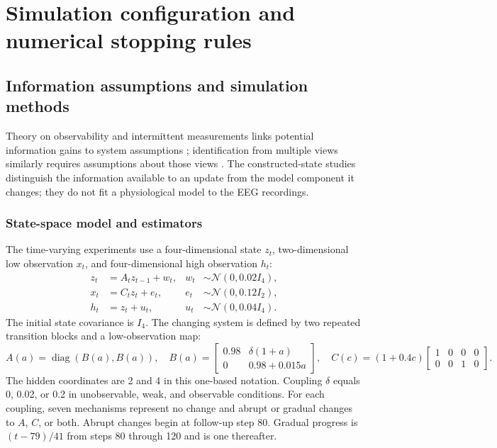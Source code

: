 \documentclass[11pt,a4paper]{article}
\begin{document}
\section{Simulation configuration and numerical stopping rules}
\label{app:simulation}

\subsection{Information assumptions and simulation methods}

Theory on observability and intermittent measurements links potential information gains to system assumptions \cite{sinopoli2004,sandberg2008,ahdab2025}; identification from multiple views similarly requires assumptions about those views \cite{yao2024}. The constructed-state studies distinguish the information available to an update from the model component it changes; they do not fit a physiological model to the EEG recordings.

\subsubsection{State-space model and estimators}
\label{sec:simulation}

The time-varying experiments use a four-dimensional state $z_t$, two-dimensional low observation $x_t$, and four-dimensional high observation $h_t$:
\begin{align}
 z_t&=A_tz_{t-1}+w_t, & w_t&\sim\mathcal N(0,0.02I_4),\\
 x_t&=C_tz_t+e_t, & e_t&\sim\mathcal N(0,0.12I_2),\\
 h_t&=z_t+u_t, & u_t&\sim\mathcal N(0,0.04I_4).
\end{align}
The initial state covariance is $I_4$. The changing system is defined by two repeated transition blocks and a low-observation map:
\begin{equation}
 A(a)=\operatorname{diag}\!\left(B(a),B(a)\right),\quad
 B(a)=\begin{bmatrix}0.98&\delta(1+a)\\0&0.98+0.015a\end{bmatrix},\quad
 C(c)=(1+0.4c)\begin{bmatrix}1&0&0&0\\0&0&1&0\end{bmatrix}.
\end{equation}
The hidden coordinates are 2 and 4 in this one-based notation. Coupling $\delta$ equals 0, 0.02, or 0.2 in unobservable, weak, and observable conditions. For each coupling, seven mechanisms represent no change and abrupt or gradual changes to $A$, $C$, or both. Abrupt changes begin at follow-up step 80. Gradual progress is $(t-79)/41$ from steps 80 through 120 and is one thereafter.
\end{document}
